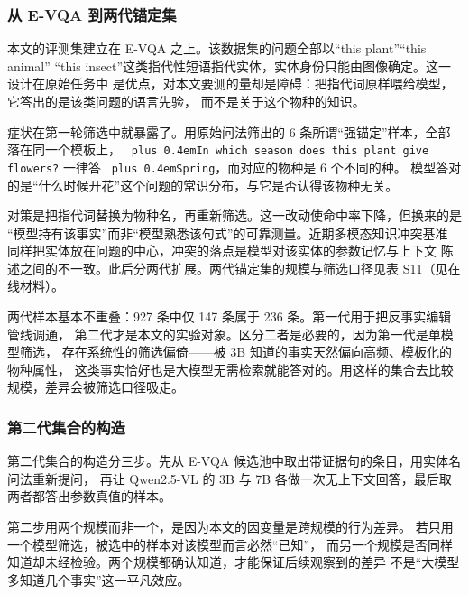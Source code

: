 \documentclass[10.5pt,compsoc,UTF8]{CjC}
\theoremstyle{mystyle}
\DeclareRobustCommand{\code}[1]{\texttt{\spaceskip=0pt plus 0.4em\relax#1}}
\DeclareRobustCommand{\codesplit}[1]{\texttt{\spaceskip=0pt plus 0.4em\relax#1}}
\begin{document}
\subsubsection{从 E-VQA 到两代锚定集}
\label{sec:4-1-1}

本文的评测集建立在 E-VQA 之上。该数据集的问题全部以“this plant”“this animal”
“this insect”这类指代性短语指代实体，实体身份只能由图像确定。这一设计在原始任务中
是优点，对本文要测的量却是障碍：把指代词原样喂给模型，它答出的是该类问题的语言先验，
而不是关于这个物种的知识。

症状在第一轮筛选中就暴露了。用原始问法筛出的 6 条所谓“强锚定”样本，全部落在同一个模板上，
\codesplit{I\allowbreak{}n\allowbreak{} w\allowbreak{}h\allowbreak{}i\allowbreak{}c\allowbreak{}h\allowbreak{} s\allowbreak{}e\allowbreak{}a\allowbreak{}s\allowbreak{}o\allowbreak{}n\allowbreak{} d\allowbreak{}o\allowbreak{}e\allowbreak{}s\allowbreak{} t\allowbreak{}h\allowbreak{}i\allowbreak{}s\allowbreak{} p\allowbreak{}l\allowbreak{}a\allowbreak{}n\allowbreak{}t\allowbreak{} g\allowbreak{}i\allowbreak{}v\allowbreak{}e\allowbreak{} f\allowbreak{}l\allowbreak{}o\allowbreak{}w\allowbreak{}e\allowbreak{}r\allowbreak{}s\allowbreak{}?\allowbreak{}} 一律答 \code{Spring}，而对应的物种是 6 个不同的种。
模型答对的是“什么时候开花”这个问题的常识分布，与它是否认得该物种无关。

对策是把指代词替换为物种名，再重新筛选。这一改动使命中率下降，但换来的是
“模型持有该事实”而非“模型熟悉该句式”的可靠测量。近期多模态知识冲突基准
同样把实体放在问题的中心\cite{ref31}，冲突的落点是模型对该实体的参数记忆与上下文
陈述之间的不一致。此后分两代扩展。两代锚定集的规模与筛选口径见表 S11（见在线材料）。

两代样本基本不重叠：927 条中仅 147 条属于 236 条。第一代用于把反事实编辑管线调通，
第二代才是本文的实验对象。区分二者是必要的，因为第一代是单模型筛选，
存在系统性的筛选偏倚——被 3B 知道的事实天然偏向高频、模板化的物种属性，
这类事实恰好也是大模型无需检索就能答对的。用这样的集合去比较规模，差异会被筛选口径吸走。

\subsubsection{第二代集合的构造}
\label{sec:4-1-2}

第二代集合的构造分三步。先从 E-VQA 候选池中取出带证据句的条目，用实体名问法重新提问，
再让 Qwen2.5-VL 的 3B 与 7B 各做一次无上下文回答，最后取两者都答出参数真值的样本。

第二步用两个规模而非一个，是因为本文的因变量是跨规模的行为差异。
若只用一个模型筛选，被选中的样本对该模型而言必然“已知”，
而另一个规模是否同样知道却未经检验。两个规模都确认知道，才能保证后续观察到的差异
不是“大模型多知道几个事实”这一平凡效应。
\end{document}
